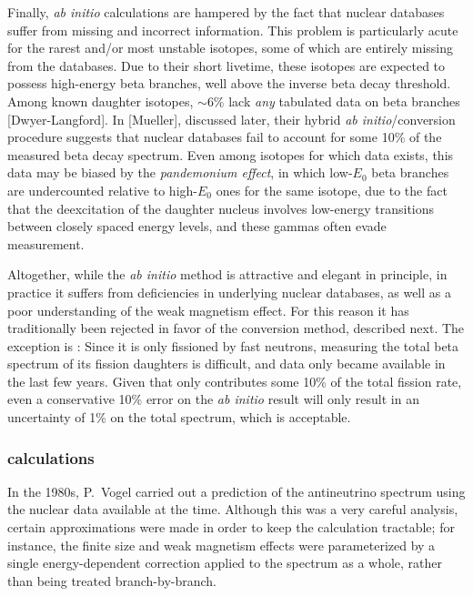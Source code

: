 \documentclass[../thesis.tex]{subfiles}
\begin{document}
Finally, \emph{ab initio} calculations are hampered by the fact that nuclear databases suffer from missing and incorrect information. This problem is particularly acute for the rarest and/or most unstable isotopes, some of which are entirely missing from the databases. Due to their short livetime, these isotopes are expected to possess high-energy beta branches, well above the inverse beta decay threshold. Among known daughter isotopes, $\sim$6\% lack \emph{any} tabulated data on beta branches [Dwyer-Langford]. In [Mueller], discussed later, their hybrid \emph{ab initio}/conversion procedure suggests that nuclear databases fail to account for some 10\% of the measured beta decay spectrum. Even among isotopes for which data exists, this data may be biased by the \emph{pandemonium effect}, in which low-$E_0$ beta branches are undercounted relative to high-$E_0$ ones for the same isotope, due to the fact that the deexcitation of the daughter nucleus involves low-energy transitions between closely spaced energy levels, and these gammas often evade measurement.

Altogether, while the \emph{ab initio} method is attractive and elegant in principle, in practice it suffers from deficiencies in underlying nuclear databases, as well as a poor understanding of the weak magnetism effect. For this reason it has traditionally been rejected in favor of the conversion method, described next. The exception is \ureight: Since it is only fissioned by fast neutrons, measuring the total beta spectrum of its fission daughters is difficult, and data only became available in the last few years. Given that \ureight only contributes some 10\% of the total fission rate, even a conservative 10\% error on the \emph{ab initio} result will only result in an uncertainty of 1\% on the total spectrum, which is acceptable.

\subsubsection{\ureight calculations}
\label{sec:vogel}

In the 1980s, P.~Vogel carried out a prediction of the \ureight antineutrino spectrum using the nuclear data available at the time. Although this was a very careful analysis, certain approximations were made in order to keep the calculation tractable; for instance, the finite size and weak magnetism effects were parameterized by a single energy-dependent correction applied to the spectrum as a whole, rather than being treated branch-by-branch.
\end{document}
